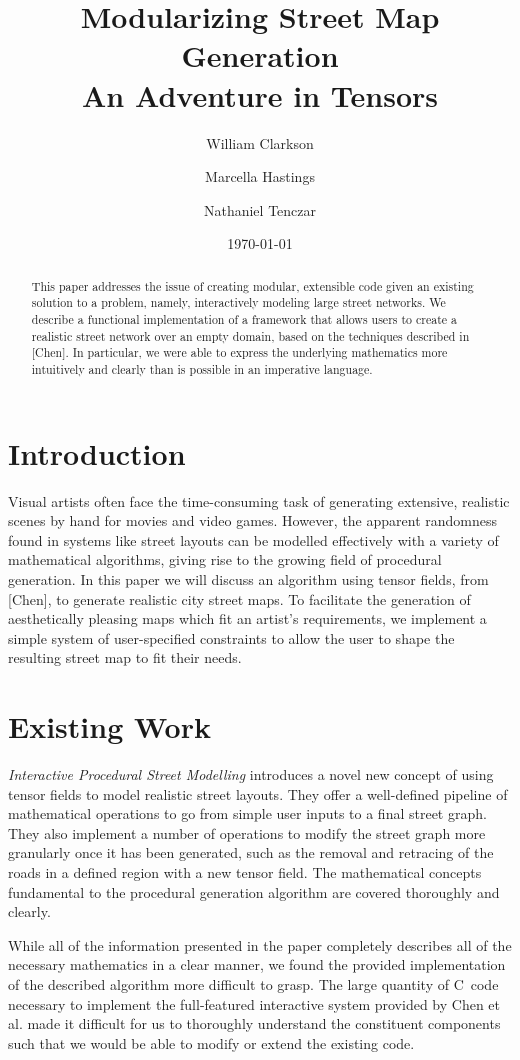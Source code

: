 \documentclass[twocolumn]{article}
\title{Modularizing Street Map Generation \\
    \vspace{8pt} \large An Adventure in Tensors}
\author{William Clarkson \and Marcella Hastings \and Nathaniel Tenczar}
\date{\today}
\def \cpp {C\nolinebreak[4]\hspace{-.05em}\raisebox{.4ex}{\tiny\bf ++}~}
\begin{document}
\maketitle

\begin{abstract}
This paper addresses the issue of creating modular, extensible code given an
existing solution to a problem, namely, interactively modeling large street
networks. We describe a functional implementation of a framework that allows
users to create a realistic street network over an empty domain, based on the
techniques described
in [Chen]. In particular, we were able to express the underlying mathematics
more intuitively and clearly than is possible in an imperative language.

\end{abstract}

\section{Introduction}
Visual artists often face the time-consuming task of generating extensive,
realistic scenes by hand for movies and video games. However, the apparent
randomness found in systems like street layouts can be modelled effectively
with a variety of mathematical algorithms, giving rise to the growing field of
procedural generation. In this paper we will discuss an algorithm using tensor
fields, from [Chen], to generate realistic city street maps. To facilitate the
generation of aesthetically pleasing maps which fit an artist's requirements,
we implement a simple system of user-specified constraints to allow the user to
shape the resulting street map to fit their needs.

\section{Existing Work}
\textit{Interactive Procedural Street Modelling} \cite{chen} introduces a novel
new concept of using tensor fields to model realistic street layouts. They
offer
a well-defined pipeline of mathematical operations to go from simple user
inputs to a final street graph. They also implement a number of operations to
modify the street graph more granularly once it has been generated, such as the
removal and retracing of the roads in a defined region with a new
tensor field. The mathematical concepts fundamental to the procedural
generation algorithm are covered thoroughly and clearly.

While all of the information presented in the paper completely describes all of
the necessary mathematics in a clear manner,
we found the provided implementation of the described
algorithm more difficult to grasp. The large quantity of \cpp code necessary to
implement the full-featured interactive system provided by Chen et al. made it
difficult for us to thoroughly understand the constituent components such that
we would be able to modify or extend the existing code.
\end{document}
